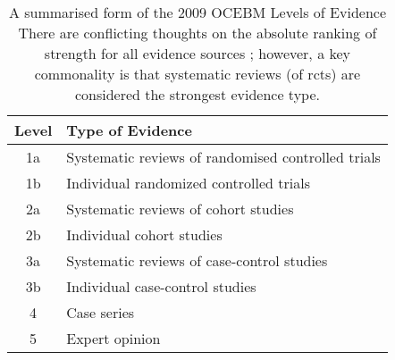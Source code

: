 \begin{table}[ht]
\centering
\small
\begin{adjustbox}{width=\columnwidth/2}
\begin{tabular}{|c|l|}
\hline
\textbf{Level} & \textbf{Type of Evidence} \\
\hline
1a & Systematic reviews of randomised controlled trials \\
1b & Individual randomized controlled trials \\
2a & Systematic reviews of cohort studies \\
2b & Individual cohort studies \\
3a & Systematic reviews of case-control studies \\
3b & Individual case-control studies \\
4 & Case series \\
5 & Expert opinion \\
\hline
\end{tabular}
\end{adjustbox}
\caption[A summarised form of the 2009 OCEBM Levels of Evidence]{A summarised form of the 2009 OCEBM Levels of Evidence \cite{noauthor_oxford_nodate} There are conflicting thoughts on the absolute ranking of strength for all evidence sources \cite{swanson_how_2010, guyatt_grade_2008}; however, a key commonality is that systematic reviews (of \glspl*{rct}) are considered the strongest evidence type.}
\label{tab:evidence_levels}
\end{table}